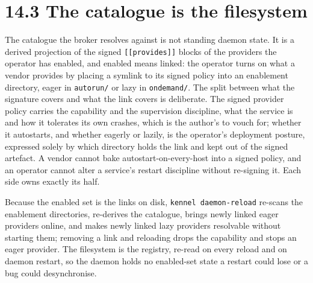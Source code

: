 \hypertarget{the-catalogue-is-the-filesystem}{%
\section{14.3 The catalogue is the
filesystem}\label{the-catalogue-is-the-filesystem}}

The catalogue the broker resolves against is not standing daemon state.
It is a derived projection of the signed \texttt{{[}{[}provides{]}{]}}
blocks of the providers the operator has enabled, and enabled means
linked: the operator turns on what a vendor provides by placing a
symlink to its signed policy into an enablement directory, eager in
\texttt{autorun/} or lazy in \texttt{ondemand/}. The split between what
the signature covers and what the link covers is deliberate. The signed
provider policy carries the capability and the supervision discipline,
what the service is and how it tolerates its own crashes, which is the
author's to vouch for; whether it autostarts, and whether eagerly or
lazily, is the operator's deployment posture, expressed solely by which
directory holds the link and kept out of the signed artefact. A vendor
cannot bake autostart-on-every-host into a signed policy, and an
operator cannot alter a service's restart discipline without re-signing
it. Each side owns exactly its half.

Because the enabled set is the links on disk,
\texttt{kennel\ daemon-reload} re-scans the enablement directories,
re-derives the catalogue, brings newly linked eager providers online,
and makes newly linked lazy providers resolvable without starting them;
removing a link and reloading drops the capability and stops an eager
provider. The filesystem is the registry, re-read on every reload and on
daemon restart, so the daemon holds no enabled-set state a restart could
lose or a bug could desynchronise.

